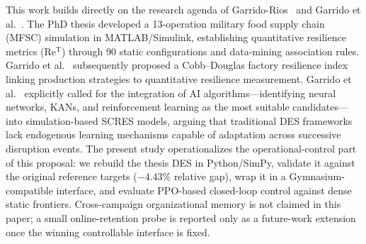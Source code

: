 This work builds directly on the research agenda of Garrido-Rios~\cite{garrido2017}
and Garrido et al.~\cite{garrido2024ijpr,garrido2024iccl}. The PhD thesis developed a
13-operation military food supply chain (MFSC) simulation in
MATLAB/Simulink, establishing quantitative resilience metrics
($\mathrm{Re^{T}}$) through 90 static configurations and data-mining
association rules. Garrido et al.~\cite{garrido2024ijpr} subsequently proposed a
Cobb--Douglas factory resilience index linking production strategies
to quantitative resilience measurement. Garrido et al.~\cite{garrido2024iccl}
explicitly called for the integration of AI algorithms---identifying
neural networks, KANs, and reinforcement learning as the most suitable
candidates---into simulation-based SCRES models, arguing that
traditional DES frameworks lack endogenous learning mechanisms capable
of adaptation across successive disruption events. The present study
operationalizes the operational-control part of this proposal: we rebuild
the thesis DES in Python/SimPy, validate it against the original
reference targets ($-4.43\%$ relative gap), wrap it in a
Gymnasium-compatible interface, and evaluate PPO-based closed-loop
control against dense static frontiers. Cross-campaign organizational
memory is not claimed in this paper; a small online-retention probe is
reported only as a future-work extension once the winning controllable
interface is fixed.

